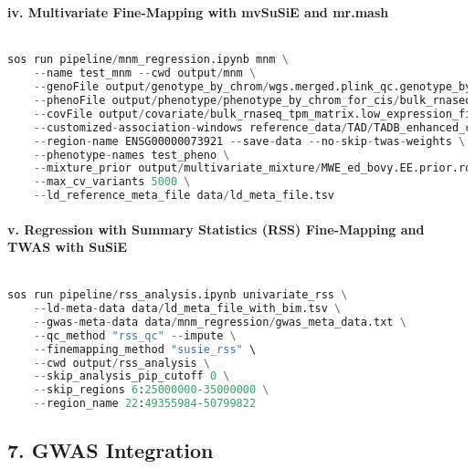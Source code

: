 \documentclass[12pt]{article}
\begin{document}
\paragraph*{iv. Multivariate Fine-Mapping with mvSuSiE and mr.mash}


\noindent
\begin{lstlisting}[language=Python]

sos run pipeline/mnm_regression.ipynb mnm \
    --name test_mnm --cwd output/mnm \
    --genoFile output/genotype_by_chrom/wgs.merged.plink_qc.genotype_by_chrom_files.txt \
    --phenoFile output/phenotype/phenotype_by_chrom_for_cis/bulk_rnaseq.phenotype_by_chrom_files.region_list.txt \
    --covFile output/covariate/bulk_rnaseq_tpm_matrix.low_expression_filtered.outlier_removed.tmm.expression.covariates.wgs.merged.plink_qc.plink_qc.prune.pca.Marchenko_PC.gz \
    --customized-association-windows reference_data/TAD/TADB_enhanced_cis.bed \
    --region-name ENSG00000073921 --save-data --no-skip-twas-weights \
    --phenotype-names test_pheno \
    --mixture_prior output/multivariate_mixture/MWE_ed_bovy.EE.prior.rds \
    --max_cv_variants 5000 \
	--ld_reference_meta_file data/ld_meta_file.tsv

\end{lstlisting}




\paragraph*{v. Regression with Summary Statistics (RSS) Fine-Mapping and TWAS with SuSiE}


\noindent
\begin{lstlisting}[language=Python]

sos run pipeline/rss_analysis.ipynb univariate_rss \
    --ld-meta-data data/ld_meta_file_with_bim.tsv \
    --gwas-meta-data data/mnm_regression/gwas_meta_data.txt \
    --qc_method "rss_qc" --impute \
    --finemapping_method "susie_rss" \
    --cwd output/rss_analysis \
    --skip_analysis_pip_cutoff 0 \
    --skip_regions 6:25000000-35000000 \
    --region_name 22:49355984-50799822

\end{lstlisting}




\subsection*{7. GWAS Integration}
\end{document}
